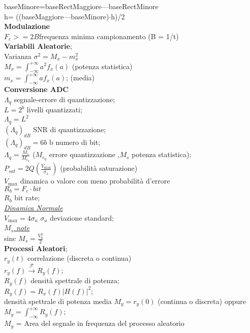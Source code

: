 \documentclass[a4paper]{article}
\begin{document}
\begin{multicols*}{3}
baseMinore=baseRectMaggiore---baseRectMinore\\
h= ((baseMaggiore---baseMinore)$\cdot$h)/2 \\
\textbf{Modulazione} \\
$F_c>=2B$frequenza minima campionamento (B = 1/t)\\
\textbf{Variabili Aleatorie}; \\
Varianza $\sigma^2=M_x-m_x^2$ \\
$M_x=\int_{-\infty}^{+\infty} a^2 f_x(a)$ (potenza statistica)\\
$m_x=\int_{-\infty}^{+\infty} a f_x(a)$; (media)\\
\textbf{Conversione ADC} \\
$\Lambda_q$ segnale-errore di quantizzazione; \\
$L=2^b$ livelli quantizzati; \\
$\Lambda_q = L^2$ \\
${(\Lambda_q)}_{dB}$ SNR di quantizzazione; \\
${(\Lambda_q)}_{dB} = 6b$ b numero di bit; \\
${\Lambda}_q=\frac{M_s}{M_{e_q}}$ ($M_{e_q}$ errore quantizzazione 
,$M_s$ potenza statistica); \\
$P_{sat}=2Q(\frac{V_{\max}}{\sigma_x})$ (probabilità saturazione) \\
$V_{\max}$ dinamica o valore con meno probabilità d'errore \\
$R_b=F_c \cdot bit$ \\
$R_b$ bit rate; \\
\underline{\textit{Dinamica Normale}} \\
$V_{\max} = 4\sigma_a$ $\sigma_a$ deviazione standard;\\ 
\underline{\textit{$M_s$ note}} \\
sinc $M_s = \frac{V_0^2}{2}$ \\
\textbf{Processi Aleatori}; \\
$r_y(t)$ correlazione (discreta o continua) \\
$r_y(f) \xrightarrow{\mathscr{F}} R_y(f)$; \\ 
$R_y(f)$ densità spettrale di potenza; \\
$R_y(f) = R_x(f) |H(f)|^2$; \\
densità spettrale di potenza media
$M_y = r_y(0)$ (continua o discreta) oppure 
$M_y = \int_{-\infty}^{+\infty} R_y(f)$;\\
$M_y$ = Area del segnale in frequenza del processo aleatorio \\

\end{multicols*}
\end{document}
